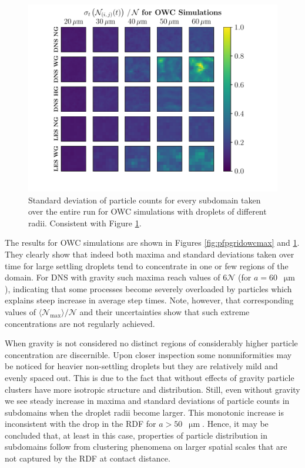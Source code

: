 \documentclass{pracamgren}
\begin{document}
\begin{figure}[!h]
\centering
\includegraphics[width=13.5cm]{figures/3-19_pfpgridowcstd.pdf}
\caption{
Standard deviation of particle counts for every subdomain taken over the entire run for OWC simulations with droplets of different radii.
Consistent with Figure \ref{fig:pfpgridowcstd}.
}
\label{fig:pfpgridowcstd}
\end{figure}

The results for OWC simulations are shown in Figures \ref{fig:pfpgridowcmax} and \ref{fig:pfpgridowcstd}.
They clearly show that indeed both maxima and standard deviations taken over time for large settling droplets tend to concentrate in one or few regions of the domain.
For DNS with gravity such maxima reach values of $6 \mathcal{N}$ (for ${a = 60}$~$\upmu\text{m}$), indicating that some processes become severely overloaded by particles which explains steep increase in average step times.
Note, however, that corresponding values of $\langle \mathcal{N}_{\max} \rangle / \mathcal{N}$ and their uncertainties show that such extreme concentrations are not regularly achieved.

When gravity is not considered no distinct regions of considerably higher particle concentration are discernible.
Upon closer inspection some nonuniformities may be noticed for heavier non-settling droplets but they are relatively mild and evenly spaced out.
This is due to the fact that without effects of gravity particle clusters have more isotropic structure and distribution.
Still, even without gravity we see steady increase in maxima and standard deviations of particle counts in subdomains when the droplet radii become larger.
This monotonic increase is inconsistent with the drop in the RDF for ${a > 50}$~$\upmu\text{m}$.
Hence, it may be concluded that, at least in this case, properties of particle distribution in subdomains follow from clustering phenomena on larger spatial scales that are not captured by the RDF at contact distance. 
\end{document}
